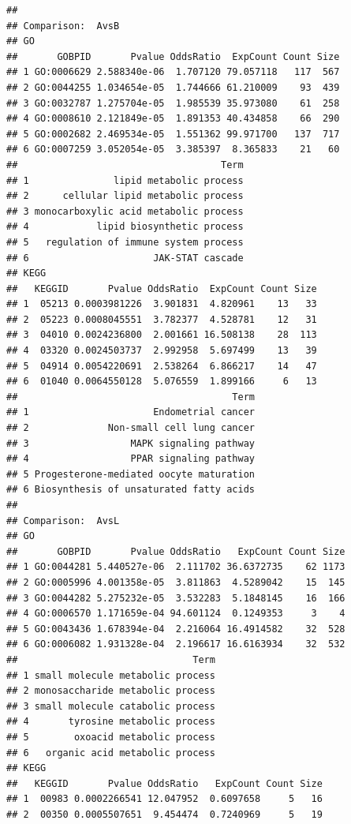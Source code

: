 \documentclass{article}\usepackage[]{graphicx}\usepackage[]{color}
\makeatletter
\newenvironment{kframe}{%
 \def\at@end@of@kframe{}%
 \ifinner\ifhmode%
  \def\at@end@of@kframe{\end{minipage}}%
  \begin{minipage}{\columnwidth}%
 \fi\fi%
 \def\FrameCommand##1{\hskip\@totalleftmargin \hskip-\fboxsep
 \colorbox{shadecolor}{##1}\hskip-\fboxsep
     \hskip-\linewidth \hskip-\@totalleftmargin \hskip\columnwidth}%
 \MakeFramed {\advance\hsize-\width
   \@totalleftmargin\z@ \linewidth\hsize
   \@setminipage}}%
 {\par\unskip\endMakeFramed%
 \at@end@of@kframe}
\newenvironment{knitrout}{}{} %
\makeatother
\begin{document}
\begin{knitrout}
\color{fgcolor}\begin{kframe}
\begin{verbatim}
## 
## Comparison:  AvsB 
## GO
##       GOBPID       Pvalue OddsRatio  ExpCount Count Size
## 1 GO:0006629 2.588340e-06  1.707120 79.057118   117  567
## 2 GO:0044255 1.034654e-05  1.744666 61.210009    93  439
## 3 GO:0032787 1.275704e-05  1.985539 35.973080    61  258
## 4 GO:0008610 2.121849e-05  1.891353 40.434858    66  290
## 5 GO:0002682 2.469534e-05  1.551362 99.971700   137  717
## 6 GO:0007259 3.052054e-05  3.385397  8.365833    21   60
##                                    Term
## 1               lipid metabolic process
## 2      cellular lipid metabolic process
## 3 monocarboxylic acid metabolic process
## 4            lipid biosynthetic process
## 5   regulation of immune system process
## 6                      JAK-STAT cascade
## KEGG
##   KEGGID       Pvalue OddsRatio  ExpCount Count Size
## 1  05213 0.0003981226  3.901831  4.820961    13   33
## 2  05223 0.0008045551  3.782377  4.528781    12   31
## 3  04010 0.0024236800  2.001661 16.508138    28  113
## 4  03320 0.0024503737  2.992958  5.697499    13   39
## 5  04914 0.0054220691  2.538264  6.866217    14   47
## 6  01040 0.0064550128  5.076559  1.899166     6   13
##                                      Term
## 1                      Endometrial cancer
## 2              Non-small cell lung cancer
## 3                  MAPK signaling pathway
## 4                  PPAR signaling pathway
## 5 Progesterone-mediated oocyte maturation
## 6 Biosynthesis of unsaturated fatty acids
## 
## Comparison:  AvsL 
## GO
##       GOBPID       Pvalue OddsRatio   ExpCount Count Size
## 1 GO:0044281 5.440527e-06  2.111702 36.6372735    62 1173
## 2 GO:0005996 4.001358e-05  3.811863  4.5289042    15  145
## 3 GO:0044282 5.275232e-05  3.532283  5.1848145    16  166
## 4 GO:0006570 1.171659e-04 94.601124  0.1249353     3    4
## 5 GO:0043436 1.678394e-04  2.216064 16.4914582    32  528
## 6 GO:0006082 1.931328e-04  2.196617 16.6163934    32  532
##                               Term
## 1 small molecule metabolic process
## 2 monosaccharide metabolic process
## 3 small molecule catabolic process
## 4       tyrosine metabolic process
## 5        oxoacid metabolic process
## 6   organic acid metabolic process
## KEGG
##   KEGGID       Pvalue OddsRatio   ExpCount Count Size
## 1  00983 0.0002266541 12.047952  0.6097658     5   16
## 2  00350 0.0005507651  9.454474  0.7240969     5   19

\end{verbatim}
\end{kframe}
\end{knitrout}
\end{document}
